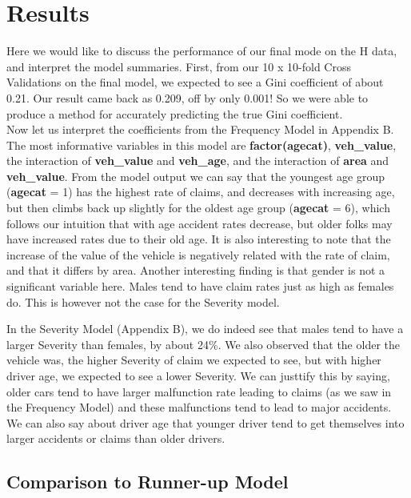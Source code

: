 \documentclass[a4paper]{article}\usepackage[]{graphicx}\usepackage[]{color}
\begin{document}
\section*{Results}

Here we would like to discuss the performance of our final mode on the H data, and interpret the model summaries. First, from our 10 x 10-fold Cross Validations on the final model, we expected to see a Gini coefficient of about 0.21. Our result came back as 0.209, off by only 0.001! So we were able to produce a method for accurately predicting the true Gini coefficient.
\\

Now let us interpret the coefficients from the Frequency Model in Appendix B. The most informative variables in this model are \textbf{factor(agecat)}, \textbf{veh\_value}, the interaction of \textbf{veh\_value} and \textbf{veh\_age}, and the interaction of \textbf{area} and \textbf{veh\_value}. From the model output we can say that the youngest age group (\textbf{agecat} = 1) has the highest rate of claims, and decreases with increasing age, but then climbs back up slightly for the oldest age group (\textbf{agecat} = 6), which follows our intuition that with age accident rates decrease, but older folks may have increased rates due to their old age. It is also interesting to note that the increase of the value of the vehicle is negatively related with the rate of claim, and that it differs by area. Another interesting finding is that gender is not a significant variable here. Males tend to have claim rates just as high as females do. This is however not the case for the Severity model.

In the Severity Model (Appendix B), we do indeed see that males tend to have a larger Severity than females, by about 24\%. We also observed that the older the vehicle was, the higher Severity of claim we expected to see, but with higher driver age, we expected to see a lower Severity. We can justtify this by saying, older cars tend to have larger malfunction rate leading to claims (as we saw in the Frequency Model) and these malfunctions tend to lead to major accidents. We can also say about driver age that younger driver tend to get themselves into larger accidents or claims than older drivers.

\subsection*{Comparison to Runner-up Model}
\end{document}
